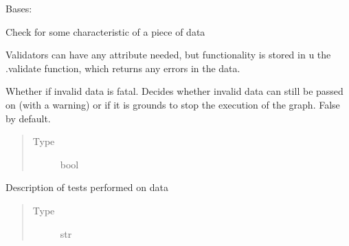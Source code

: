 \documentclass[letterpaper,10pt,english]{sphinxmanual}
\begin{document}
\begin{fulllineitems}
\label{\detokenize{dalio.validator:dalio.validator.validator.Validator}}
Bases: 

Check for some characteristic of a piece of data

Validators can have any attribute needed, but functionality is stored
in u the .validate function, which returns any errors in the data.

\begin{fulllineitems}
\label{\detokenize{dalio.validator:dalio.validator.validator.Validator.fatal}}
Whether if invalid data is fatal. Decides whether
invalid data can still be passed on (with a warning) or if it is
grounds to stop the execution of the graph. False by default.
\begin{quote}\begin{description}
\item[{Type}] \leavevmode
bool

\end{description}\end{quote}

\end{fulllineitems}


\begin{fulllineitems}
\label{\detokenize{dalio.validator:dalio.validator.validator.Validator.test_desc}}
Description of tests performed on data
\begin{quote}\begin{description}
\item[{Type}] \leavevmode
str

\end{description}\end{quote}

\end{fulllineitems}



\end{fulllineitems}
\end{document}
